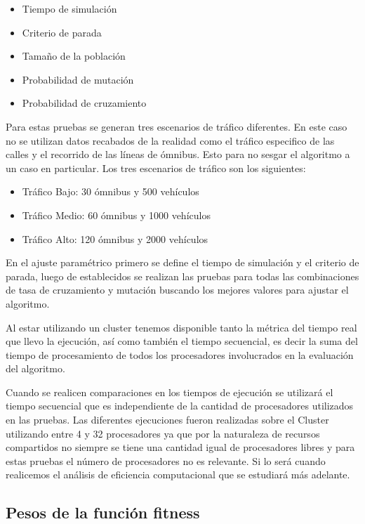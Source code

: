 \begin{itemize}
	\item Tiempo de simulación	
	\item Criterio de parada
	\item Tamaño de la población
	\item Probabilidad de mutación
	\item Probabilidad de cruzamiento
\end{itemize}

Para estas pruebas se generan tres escenarios de tráfico diferentes. En este caso no se utilizan datos recabados de la realidad como el tráfico especifico de las calles y el recorrido de las líneas de ómnibus. Esto para no sesgar el algoritmo a un caso en particular.
Los tres escenarios de tráfico son los siguientes:

\begin{itemize}
	\item Tráfico Bajo: 30 ómnibus y 500 vehículos	
	\item Tráfico Medio: 60 ómnibus y 1000 vehículos
	\item Tráfico Alto: 120 ómnibus y 2000 vehículos
\end{itemize}


En el ajuste paramétrico primero se define el tiempo de simulación y el criterio de parada, luego de establecidos se realizan las pruebas para todas las combinaciones de tasa de cruzamiento y mutación buscando los mejores valores para ajustar el algoritmo.

Al estar utilizando un cluster tenemos disponible tanto la métrica del tiempo real que llevo la ejecución, así como también el tiempo secuencial, es decir la suma del tiempo de procesamiento de todos los procesadores involucrados en la evaluación del algoritmo. 

Cuando se realicen comparaciones en los tiempos de ejecución se utilizará el tiempo secuencial que es independiente de la cantidad de procesadores utilizados en las pruebas. Las diferentes ejecuciones fueron realizadas sobre el Cluster utilizando entre 4 y 32 procesadores ya que por la naturaleza de recursos compartidos no siempre se tiene una cantidad igual  de procesadores libres y para estas pruebas el número de procesadores no es relevante. Si lo será cuando realicemos el análisis de eficiencia computacional que se estudiará más adelante.



\subsection{Pesos de la función fitness}

